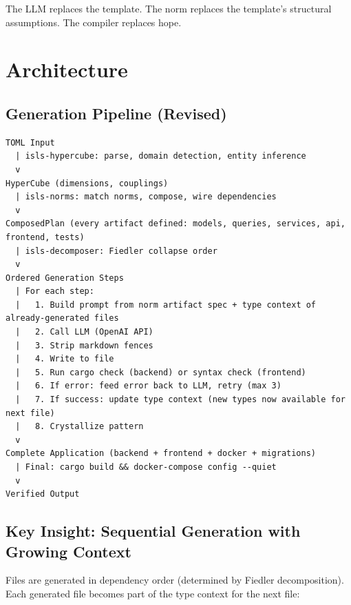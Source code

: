\documentclass[11pt,a4paper]{article}
\begin{document}
The LLM replaces the template. The norm replaces the template's
structural assumptions. The compiler replaces hope.

\section{Architecture}

\subsection{Generation Pipeline (Revised)}

\begin{lstlisting}[title=v3.1 Pipeline]
TOML Input
  | isls-hypercube: parse, domain detection, entity inference
  v
HyperCube (dimensions, couplings)
  | isls-norms: match norms, compose, wire dependencies
  v
ComposedPlan (every artifact defined: models, queries, services, api, frontend, tests)
  | isls-decomposer: Fiedler collapse order
  v
Ordered Generation Steps
  | For each step:
  |   1. Build prompt from norm artifact spec + type context of already-generated files
  |   2. Call LLM (OpenAI API)
  |   3. Strip markdown fences
  |   4. Write to file
  |   5. Run cargo check (backend) or syntax check (frontend)
  |   6. If error: feed error back to LLM, retry (max 3)
  |   7. If success: update type context (new types now available for next file)
  |   8. Crystallize pattern
  v
Complete Application (backend + frontend + docker + migrations)
  | Final: cargo build && docker-compose config --quiet
  v
Verified Output
\end{lstlisting}

\subsection{Key Insight: Sequential Generation with Growing Context}

Files are generated in dependency order (determined by Fiedler
decomposition). Each generated file becomes part of the type
context for the next file:
\end{document}
